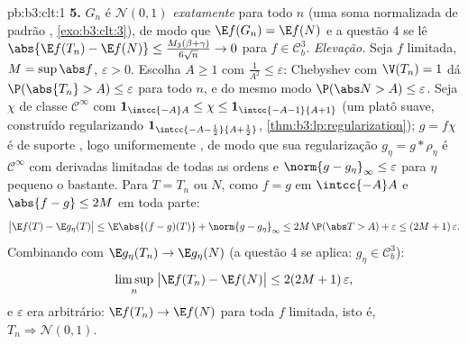 \begin{solution}{pb:b3:clt:1}
\textbf{5.} $G_n$ é $\mathcal N(0,1)$ \emph{exatamente} para
todo $n$ (uma soma normalizada de  padrão
, \cref{exo:b3:clt:3}), de modo que $\E f(G_n) = \E f(N)$
e a questão 4 se lê $\abs{\E f(T_n) - \E f(N)} \leq
\frac{M_3(\beta+\gamma)}{6\sqrt n} \to 0$ para $f \in
\mathcal C^3_b$. \emph{Elevação.} Seja $f$ 
limitada, $M = \sup\abs f$, $\varepsilon > 0$. Escolha $A
\geq 1$ com $\frac1{A^2} \leq \varepsilon$: Chebyshev com
$\V(T_n) = 1$ dá $\P(\abs{T_n} > A) \leq \varepsilon$
para todo $n$, e do mesmo modo $\P(\abs N > A) \leq \varepsilon$.
Seja $\chi$ de classe $\mathcal C^\infty$ com
$\mathbf 1_{\intcc{-A}A} \leq \chi \leq
\mathbf 1_{\intcc{-A-1}{A+1}}$ (um platô suave, construído
regularizando $\mathbf 1_{\intcc{-A-\frac12}{A+\frac12}}$,
\cref{thm:b3:lp:regularization}); $g = f\chi$ é 
de suporte , logo uniformemente , de modo que sua
regularização $g_\eta = g * \rho_\eta$ é $\mathcal
C^\infty$ com derivadas limitadas de todas as ordens e
$\norm{g - g_\eta}_\infty \leq \varepsilon$ para $\eta$
pequeno o bastante. Para $T = T_n$ ou $N$, como $f = g$ em
$\intcc{-A}A$ e $\abs{f - g} \leq 2M$ em toda parte:
\[
\bigl|\E f(T) - \E g_\eta(T)\bigr| \leq
\E\abs{(f - g)(T)} + \norm{g - g_\eta}_\infty
\leq 2M\,\P(\abs T > A) + \varepsilon \leq
(2M + 1)\,\varepsilon .
\]
Combinando com $\E g_\eta(T_n) \to \E g_\eta(N)$ (a questão
4 se aplica: $g_\eta \in \mathcal C^3_b$):
\[
\limsup_n\;\bigl|\E f(T_n) - \E f(N)\bigr| \leq
2(2M + 1)\,\varepsilon ,
\]
e $\varepsilon$ era arbitrário: $\E f(T_n) \to \E f(N)$ para
toda $f$  limitada, isto é, $T_n \Rightarrow
\mathcal N(0,1)$.


\end{solution}
